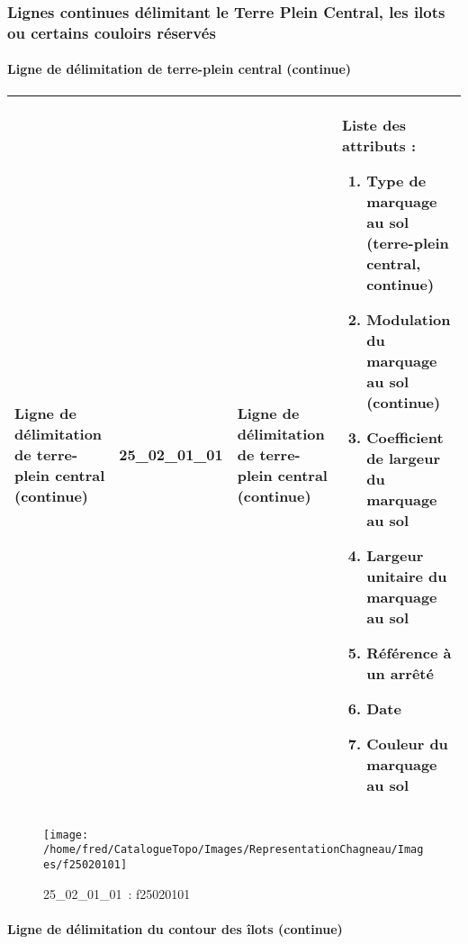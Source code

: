 \documentclass[12pt,titlepage]{book}
\begin{document}
\subsubsection{\large Lignes continues délimitant le Terre Plein Central, les ilots ou certains couloirs réservés}
\paragraph{Ligne de délimitation de terre-plein central (continue)}
\noindent
\vspace{\baselineskip}

\renewcommand{\arraystretch}{1.2}
\begin{supertabular}{|p{10cm}|c|p{13cm}|p{12cm}|}
 Ligne de délimitation de terre-plein central (continue) & 25\_02\_01\_01 & Ligne de délimitation de terre-plein central (continue) & Liste des attributs :
\begin{enumerate}
  \item Type de marquage au sol (terre-plein central, continue)  \item Modulation du marquage au sol (continue)  \item Coefficient de largeur du marquage au sol  \item Largeur unitaire du marquage au sol  \item Référence à un arrêté  \item Date  \item Couleur du marquage au sol\end{enumerate}
\\
\hline
\end{supertabular}
\begin{figure}[h!]
  \hfill         %
  \begin{minipage}[t]{3cm}
    \begin{center}
      \texttt{[image: /home/fred/CatalogueTopo/Images/RepresentationChagneau/Images/f25020101]}
      \caption[~25\_02\_01\_01]{\small{25\_02\_01\_01~:} \tiny{f25020101}}\label{f25020101}
    \end{center}
  \end{minipage}
\end{figure}


\paragraph{Ligne de délimitation du contour des îlots (continue)}
\noindent
\vspace{\baselineskip}
\end{document}
